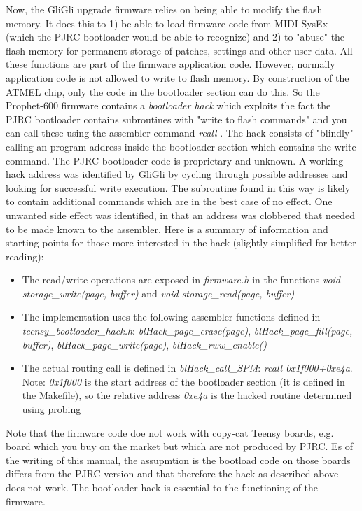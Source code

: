Now, the GliGli upgrade firmware relies on being able to modify the flash memory. It does this to 1) be able to load firmware code from MIDI SysEx (which the PJRC bootloader would be able to recognize) and 2) to "abuse" the flash memory for permanent storage of patches, settings and other user data. All these functions are part of the firmware application code. However, normally application code is not allowed to write to flash memory. By construction of the ATMEL chip, only the code in the bootloader section can do this. So the Prophet-600 firmware contains a \textit{bootloader hack} which exploits the fact the PJRC bootloader contains subroutines with "write to flash commands" and you can call these using the assembler command \textit{rcall} . The hack consists of "blindly" calling an program address inside the bootloader section which contains the write command. The PJRC bootloader code is proprietary and unknown. A working hack address was identified by GliGli by cycling through possible addresses and looking for successful write execution. The subroutine found in this way is likely to contain additional commands which are in the best case of no effect. One unwanted side effect was identified, in that an address was clobbered that needed to be made known to the assembler. Here is a summary of information and starting points for those more interested in the hack (slightly simplified for better reading):

\begin{itemize}
  \item The read/write operations are exposed in \textit{firmware.h} in the functions \textit{void storage\_write(page, buffer)} and \textit{void storage\_read(page, buffer)} 
  \item The implementation uses the following assembler functions defined in \textit{teensy\_bootloader\_hack.h}: \textit{blHack\_page\_erase(page)}, \textit{blHack\_page\_fill(page, buffer)}, \textit{blHack\_page\_write(page)}, \textit{blHack\_rww\_enable()}
  \item The actual routing call is defined in \textit{blHack\_call\_SPM}: \textit{rcall 0x1f000+0xe4a}. Note: \textit{0x1f000} is the start address of the bootloader section (it is defined in the Makefile), so the relative address \textit{0xe4a} is the hacked routine determined using probing 
\end{itemize} 

Note that the firmware code doe not work with copy-cat Teensy boards, e.g. board which you buy on the market but which are not produced by PJRC. Es of the writing of this manual, the assupmtion is the bootload code on those boards differs from the PJRC version and that therefore the hack as described above does not work. The bootloader hack is essential to the functioning of the firmware.
